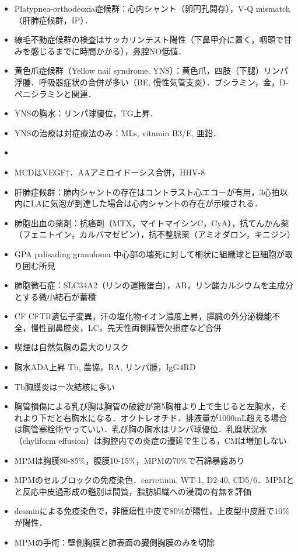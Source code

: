 \begin{itemize}

\item Platypnea-orthodeoxia症候群：心内シャント（卵円孔開存），V-Q mismatch（肝肺症候群，IP）．

\item 線毛不動症候群の検査はサッカリンテスト陽性（下鼻甲介に置く，咽頭で甘みを感じるまでに時間かかる），鼻腔NO低値．
\item 黄色爪症候群（Yellow nail syndrome, YNS）：黄色爪，四肢（下腿）リンパ浮腫．呼吸器症状の合併が多い（BE, 慢性気管支炎）．ブシラミン，金，D-ペニシラミンと関連．
\item YNSの胸水：リンパ球優位，TG上昇．
\item YNSの治療は対症療法のみ：MLs, vitamin B3/E, 亜鉛．
\item 

\item MCDはVEGF↑．AAアミロイドーシス合併，HHV-8
\item 肝肺症候群：肺内シャントの存在はコントラスト心エコーが有用，3心拍以内にLAに気泡が到達した場合は心内シャントの存在が示唆される．
\item 肺胞出血の薬剤：抗癌剤（MTX，マイトマイシンC，CyA），抗てんかん薬（フェニトイン，カルバマゼピン），抗不整脈薬（アミオダロン，キニジン）

\item GPA palisading granuloma 中心部の壊死に対して柵状に組織球と巨細胞が取り囲む所見
\item 肺胞微石症：SLC34A2（リンの運搬蛋白），AR，リン酸カルシウムを主成分とする微小結石が蓄積
\item CF CFTR遺伝子変異，汗の塩化物イオン濃度上昇，膵臓の外分泌機能不全，慢性副鼻腔炎，LC，先天性両側精管欠損症など合併
\item 喫煙は自然気胸の最大のリスク
\item 胸水ADA上昇 Tb, 農協，RA, リンパ腫，IgG4RD
\item Tb胸膜炎は一次結核に多い
\item 胸管損傷による乳び胸は胸管の破綻が第5胸椎より上で生じると左胸水，それより下だと右胸水になる．オクトレオチド．排液量が1000mL超える場合は胸管塞栓術やっていい．乳び胸の胸水はリンパ球優位．乳糜状況水（chyliform effusion）は胸腔内での炎症の遷延で生じる，CMは増加しない

\item MPMは胸膜80-85\%，腹膜10-15\%，MPMの70\%で石綿暴露あり
\item MPMのセルブロックの免疫染色．carretinin, WT-1, D2-40, CD5/6．MPMとと反応中皮過形成の鑑別は間質，脂肪組織への浸潤の有無を評価
\item desminによる免疫染色で，非腫瘍性中皮で80\%が陽性，上皮型中皮腫で10\%が陽性．
\item MPMの手術：壁側胸膜と肺表面の臓側胸膜のみを切除


\end{itemize}
